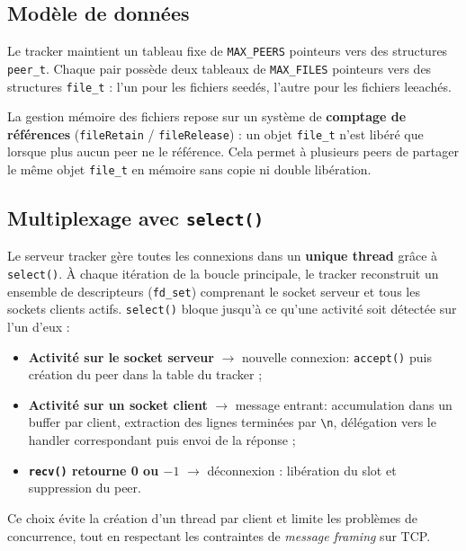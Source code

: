 \documentclass[12pt,a4paper]{article}
\begin{document}
\subsection{Modèle de données}

Le tracker maintient un tableau fixe de \texttt{MAX\_PEERS} pointeurs vers des
structures \texttt{peer\_t}. Chaque pair possède deux tableaux de
\texttt{MAX\_FILES} pointeurs vers des structures \texttt{file\_t} : l'un pour
les fichiers seedés, l'autre pour les fichiers leeachés.

La gestion mémoire des fichiers repose sur un système de \textbf{comptage de
références} (\texttt{fileRetain} / \texttt{fileRelease}) : un objet
\texttt{file\_t} n'est libéré que lorsque plus aucun peer ne le référence. Cela
permet à plusieurs peers de partager le même objet \texttt{file\_t} en mémoire
sans copie ni double libération.

\subsection{Multiplexage avec \texttt{select()}}

Le serveur tracker gère toutes les connexions dans un \textbf{unique thread}
grâce à \texttt{select()}. À chaque itération de la boucle principale, le tracker reconstruit un ensemble de descripteurs (\texttt{fd\_set}) comprenant le socket serveur et tous les sockets clients actifs. \texttt{select()} bloque jusqu'à ce qu'une activité soit détectée sur l'un d'eux :

\begin{itemize}
    \item \textbf{Activité sur le socket serveur} $\rightarrow$ nouvelle
    connexion: \texttt{accept()} puis création du peer dans la table du tracker ;

    \item \textbf{Activité sur un socket client} $\rightarrow$ message entrant:
    accumulation dans un buffer par client, extraction des lignes terminées par \texttt{\textbackslash n}, délégation vers le handler correspondant puis envoi de la réponse ;

    \item \textbf{\texttt{recv()} retourne 0 ou $-1$} $\rightarrow$
    déconnexion : libération du slot et suppression du peer.
\end{itemize}

Ce choix évite la création d'un thread par client et limite les problèmes de concurrence, tout en respectant les contraintes de \textit{message framing} sur TCP.
\end{document}
